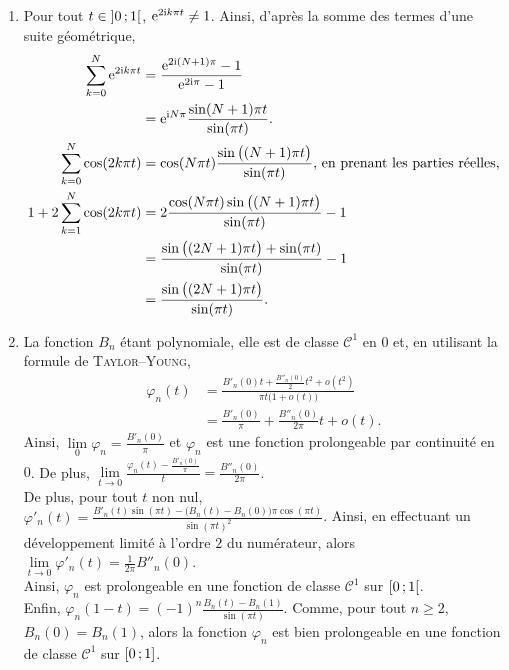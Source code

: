 \begin{solution}
    
\begin{enumerate}
    \item Pour tout $t \in \left]0\,;1\right[$, $\mathrm{e}^{2 \mathrm{i} k \pi t} \not= 1$. Ainsi, d'après la somme des termes d'une suite géométrique, 
    \begin{align*}
        \sum_{k=0}^N \mathrm{e}^{2 \mathrm{i} k \pi t} &= \frac{\mathrm{e}^{2 \mathrm{i} (N+1) \pi} - 1}{\mathrm{e}^{2 \mathrm{i} \pi} - 1} \\
        &= \mathrm{e}^{\mathrm{i} N \pi} \frac{\sin(N+1) \pi t}{\sin(\pi t)}. \\
        \sum_{k=0}^N \cos(2 k \pi t) &= \cos(N \pi t) \frac{\sin \big((N+1) \pi t \big)}{\sin(\pi t)}\text{, en prenant les parties réelles,} \\
        1 + 2 \sum_{k=1}^N \cos(2 k \pi t) &= 2 \frac{\cos(N \pi t) \sin \big((N+1) \pi t\big)}{\sin(\pi t)} - 1 \\
        &= \frac{\sin\big((2N+1) \pi t \big) + \sin( \pi t)}{\sin(\pi t)} - 1 \\
        &= \frac{\sin\big((2N+1) \pi t \big)}{\sin(\pi t)}.
    \end{align*}
    \item La fonction $B_n$ étant polynomiale, elle est de classe $\mathscr{C}^1$ en $0$ et, en utilisant la formule de \textsc{Taylor}--\textsc{Young},
    \begin{align*}
        \varphi_n(t) &= \frac{B'_n(0)t + \frac{B''_n(0)}{2}t^2 + o(t^2)}{\pi t \big(1 + o(t) \big)} \\
        &= \frac{B'_n(0)}{\pi} + \frac{B''_n(0)}{2 \pi}t + o(t).
    \end{align*}
    Ainsi, $\lim\limits_0 \varphi_n = \frac{B'_n(0)}{\pi}$ et $\varphi_n$ est une fonction prolongeable par continuité en $0$. De plus, $\lim\limits_{t \to 0} \frac{\varphi_n(t) - \frac{B'_n(0)}{\pi}}{t} = \frac{B''_n(0)}{2 \pi}$. \\
    De plus, pour tout $t$ non nul, $\varphi'_n(t) = \frac{B'_n(t) \sin(\pi t) - \big(B_n(t) - B_n(0) \big) \pi \cos(\pi t)}{\sin(\pi t)^2}$. Ainsi, en effectuant un développement limité à l'ordre $2$ du numérateur, alors $\lim\limits_{t \to 0} \varphi'_n(t) = \frac{1}{2 \pi} B''_n(0)$. \\
    Ainsi, $\varphi_n$ est prolongeable en une fonction de classe $\mathscr{C}^1$ sur $\left[0\,;1\right[$. \\
    Enfin, $\varphi_n(1-t) = (-1)^n \frac{B_n(t) - B_n(1)}{\sin(\pi t)}$. Comme, pour tout $n \geqslant 2$, $B_n(0) = B_n(1)$, alors la fonction $\varphi_n$ est bien prolongeable en une fonction de classe $\mathscr{C}^1$ sur $\left[0\,;1\right]$.

\end{enumerate}
\end{solution}
